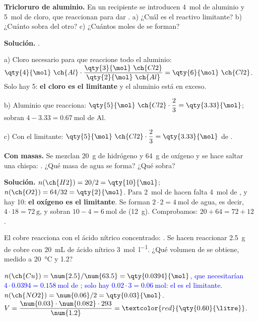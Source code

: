 \begin{example}
    \textbf{Tricloruro de aluminio.} En un recipiente se introducen \qty{4}{\mol} de aluminio y \qty{5}{\mol} de cloro, que
    reaccionan para dar . a) ¿Cuál es el reactivo limitante? b) ¿Cuánto sobra del otro? c) ¿Cuántos moles de  se
    forman?

    \textbf{Solución.} .

    a) Cloro necesario para que reaccione todo el aluminio: \(\qty{4}{\mol}\ \ch{Al} \cdot \dfrac{\qty{3}{\mol}\ \ch{Cl2}}{\qty{2}{\mol}\ \ch{Al}} =
    \qty{6}{\mol}\ \ch{Cl2}\). Solo hay 5: \textbf{el cloro es el limitante} y el aluminio está en exceso.

    b) Aluminio que reacciona: \(\qty{5}{\mol}\ \ch{Cl2} \cdot \dfrac{2}{3} = \qty{3.33}{\mol}\); sobran \(4 - \num{3.33} = \qty{0.67}{\mol}\) de Al.

    c) Con el limitante: \(\qty{5}{\mol}\ \ch{Cl2} \cdot \dfrac{2}{3} = \qty{3.33}{\mol}\) de .
\end{example}

\begin{example}
    \textbf{Con masas.} Se mezclan \qty{20}{\gram} de hidrógeno y \qty{64}{\gram} de oxígeno y se hace saltar una chispa:
    . ¿Qué masa de agua se forma? ¿Qué sobra?

    \textbf{Solución.} \(n(\ch{H2}) = 20/2 = \qty{10}{\mol}\); \(n(\ch{O2}) = 64/32 = \qty{2}{\mol}\). Para \qty{2}{\mol} de 
    hacen falta \qty{4}{\mol} de , y hay 10: \textbf{el oxígeno es el limitante}. Se forman \(2 \cdot 2 = \qty{4}{\mol}\) de
    agua, es decir, \(4 \cdot 18 = \qty{72}{\gram}\), y sobran \(10 - 4 = \qty{6}{\mol}\) de  (\qty{12}{\gram}). Comprobamos:
    \(20 + 64 = 72 + 12\).
\end{example}

\begin{exercise}
    El cobre reacciona con el ácido nítrico concentrado: . Se hacen reaccionar
    \qty{2.5}{\gram} de cobre con \qty{20}{\mL} de ácido nítrico \qty{3}{\mol\per\litre}. ¿Qué volumen de  se obtiene,
    medido a \qty{20}{\degreeCelsius} y \qty{1.2}{\atm}?
    \begin{solu}
        \textcolor{blue}{\(n(\ch{Cu}) = \num{2.5}/\num{63.5} = \qty{0.0394}{\mol}\), que necesitarían \(4 \cdot \num{0.0394} =
        \qty{0.158}{\mol}\) de ; solo hay \(\num{0.02} \cdot 3 = \qty{0.06}{\mol}\): el  es el limitante.
        \(n(\ch{NO2}) = \num{0.06}/2 = \qty{0.03}{\mol}\).} \(V = \dfrac{\num{0.03} \cdot \num{0.082} \cdot 293}{\num{1.2}} =
        \textcolor{red}{\qty{0.60}{\litre}}\).
    \end{solu}
\end{exercise}

